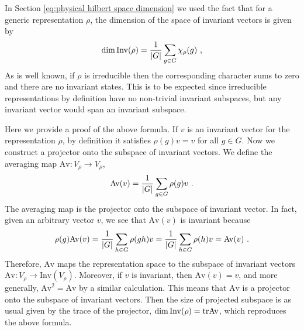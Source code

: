 In Section \ref{eq:physical hilbert space dimension} we used the fact that for a generic representation $\rho$, the dimension of the space of invariant vectors is given by
\begin{equation}
    \dim{\mathrm{Inv}(\rho)} = \frac{1}{\abs{G}} \sum_{g \in G} \chi_\rho(g) \ ,
\end{equation}
As is well known, if $\rho$ is irreducible then the corresponding character sums to zero and there are no invariant states.
This is to be expected since irreducible representations by definition have no non-trivial invariant subspaces, but any invariant vector would span an invariant subspace.

Here we provide a proof of the above formula.
If $v$ is an invariant vector for the representation $\rho$, by definition it satisfies $\rho(g) v = v$ for all $g \in G$.
Now we construct a projector onto the subspace of invariant vectors.
We define the averaging map $\mathrm{Av}: V_\rho \to V_\rho$,
\begin{equation}
    \mathrm{Av}(v) = \frac{1}{\abs{G}} \sum_{g \in G} \rho(g) v \ .
\end{equation}
The averaging map is the projector onto the subspace of invariant vector.
In fact, given an arbitrary vector $v$, we see that $\mathrm{Av}(v)$ is invariant because
\begin{equation}
    \rho(g) \mathrm{Av}(v) = \frac{1}{\abs{G}} \sum_{h \in G} \rho(g h) v = \frac{1}{\abs{G}} \sum_{h \in G} \rho(h) v = \mathrm{Av}(v) \ .
\end{equation}
Therefore, $\mathrm{Av}$ maps the representation space to the subspace of invariant vectors $\mathrm{Av}: V_\rho \to \mathrm{Inv}(V_\rho)$.
Moreover, if $v$ is invariant, then $\mathrm{Av}(v) = v$, and more generally, $\mathrm{Av}^2 = \mathrm{Av}$ by a similar calculation.
This means that $\mathrm{Av}$ is a projector onto the subspace of invariant vectors.
Then the size of projected subspace is as usual given by the trace of the projector, $\dim{\mathrm{Inv}(\rho)} = \text{tr}{\mathrm{Av}}$, which reproduces the above formula.


